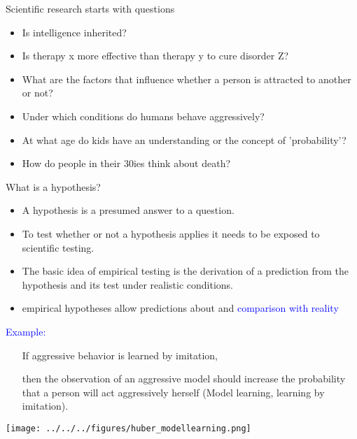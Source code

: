 \documentclass[]{beamer}
\begin{document}
\begin{frame}{Scientific research starts with questions}
\begin{itemize}
\setlength{\itemsep}{5pt}
 \item Is intelligence inherited?
 \item Is therapy x more effective than therapy y to cure disorder Z?
 \item What are the factors that influence whether a person is attracted to
another or not?
 \item Under which conditions do humans behave aggressively? 
 \item At what age do kids have an understanding or the concept of
'probability'?
 \item How do people in their 30ies think about death?
\end{itemize}
\end{frame}

\begin{frame}{What is a hypothesis?}
\begin{itemize}
 \item<2-> A hypothesis is a presumed answer to a question.
 \item<3-> To test whether or not a hypothesis applies it needs to be exposed to scientific testing. 
 \item<4-> The basic idea of empirical testing is the derivation of a prediction from the hypothesis and its test under realistic conditions.
 \item<5-> [!] empirical hypotheses allow predictions about and \textcolor{blue}{comparison with reality}
\end{itemize}
\end{frame}


\begin{frame}
\begin{overlayarea}{110mm}{80mm}
 \textcolor{blue}{Example:}
\begin{itemize}
 \item [If] aggressive behavior is learned by imitation,
 \item [then] the observation of an aggressive model should increase the probability that a person will act aggressively herself (Model learning, learning by imitation).
\end{itemize}

\begin{center}
\texttt{[image: ../../../figures/huber\_modellearning.png]}
\end{center}

\end{overlayarea}
\end{frame}
\end{document}
